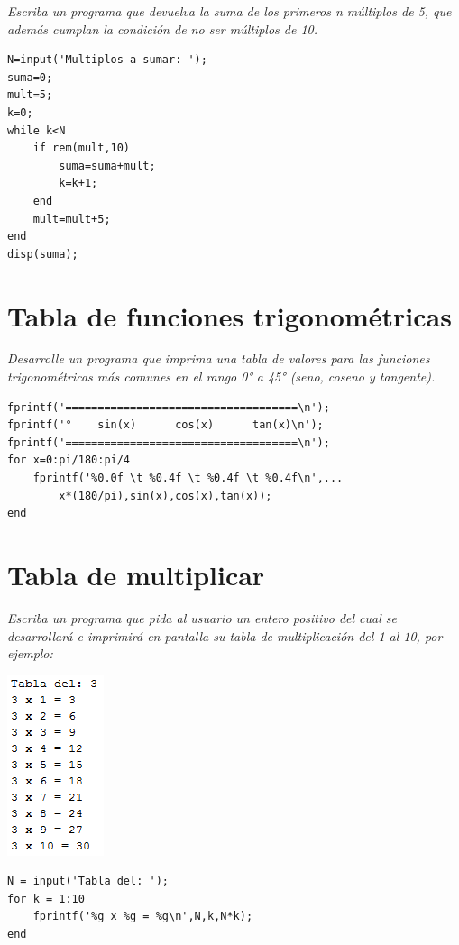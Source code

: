 \textit{Escriba un programa que devuelva la suma de los primeros n múltiplos de 5, que además cumplan la condición de no ser múltiplos de 10.}

\begin{verbatim}
N=input('Multiplos a sumar: ');
suma=0;
mult=5;
k=0;
while k<N
    if rem(mult,10)
        suma=suma+mult;
        k=k+1;
    end
    mult=mult+5;
end
disp(suma);
\end{verbatim}

\section{Tabla de funciones trigonométricas}

\textit{Desarrolle un programa que imprima una tabla de valores para las funciones trigonométricas más comunes en el rango 0° a 45° (seno, coseno y tangente).}

\begin{verbatim}
fprintf('====================================\n');
fprintf('°    sin(x)      cos(x)      tan(x)\n');
fprintf('====================================\n');
for x=0:pi/180:pi/4
    fprintf('%0.0f \t %0.4f \t %0.4f \t %0.4f\n',...
        x*(180/pi),sin(x),cos(x),tan(x));
end
\end{verbatim}

\section{Tabla de multiplicar} 

\textit{Escriba un programa que pida al usuario un entero positivo del cual se desarrollará e imprimirá en pantalla su tabla de multiplicación del 1 al 10, por ejemplo:}

\begin{center}
\includegraphics[scale=0.8]{src/tablamult.png}
\end{center}



\begin{verbatim}
N = input('Tabla del: ');
for k = 1:10
    fprintf('%g x %g = %g\n',N,k,N*k);
end
\end{verbatim}

